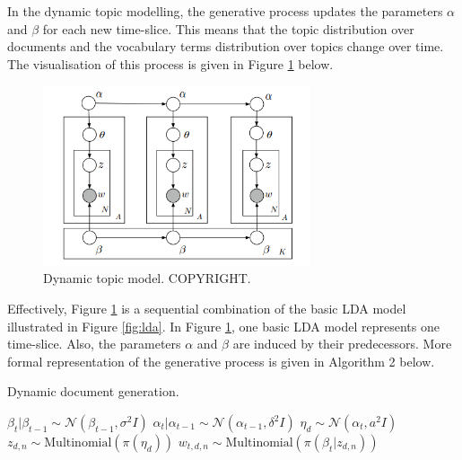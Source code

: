 \documentclass{mprop}
\begin{document}
\par In the dynamic topic modelling, the generative process updates the parameters $\alpha$ and $\beta$ for each new time-slice. This means that the topic distribution over documents and the vocabulary terms distribution over topics change over time. The visualisation of this process is given in Figure \ref{fig:dtm} below.
\begin{figure}[H]
  \centering
  \includegraphics[width=0.7\textwidth]{dynamic_topic_model}
  \caption{Dynamic topic model. COPYRIGHT.}
  \label{fig:dtm}
\end{figure}
Effectively, Figure \ref{fig:dtm} is a sequential combination of the basic LDA model illustrated in Figure \ref{fig:lda}. In Figure \ref{fig:dtm}, one basic LDA model represents one time-slice. Also, the parameters $\alpha$ and $\beta$ are induced by their predecessors. More formal representation of the generative process is given in Algorithm 2 below. 
\begin{algorithm}[H]
\caption{Dynamic document generation.}
\label{alg:dynamic_document_generation}
\begin{algorithmic}[2]
\State $\beta_t | \beta_{t-1} \sim \mathcal{N}(\beta_{t-1}, \sigma^2I)$
\State $\alpha_t | \alpha_{t-1} \sim \mathcal{N}(\alpha_{t-1}, \delta^2I)$
\State $\eta_d \sim \mathcal{N}(\alpha_{t}, a^2I)$
\State $z_{d, n} \sim \mbox{Multinomial}(\pi(\eta_d))$
\State $w_{t, d, n} \sim \mbox{Multinomial}(\pi(\beta_t | z_{d, n}))$
\EndFor
\EndFor
\end{algorithmic}
\end{algorithm}
\end{document}
